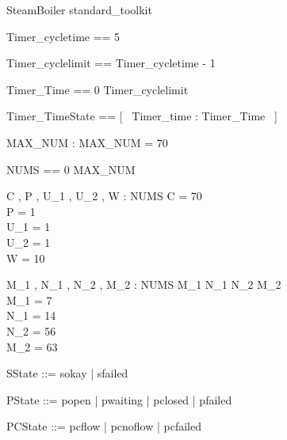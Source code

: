 \documentclass{article}
\begin{document}
\begin{zsection}
    \SECTION SteamBoiler \parents standard\_toolkit
\end{zsection}

\begin{zed}
	Timer\_cycletime == 5
\end{zed}

\begin{zed}
	Timer\_cyclelimit == Timer\_cycletime - 1
\end{zed}

\begin{zed}
	Timer\_Time == 0 \upto Timer\_cyclelimit
\end{zed}

\begin{zed}
	Timer\_TimeState == [~  Timer\_time : Timer\_Time  ~]
\end{zed}

\begin{axdef}
	MAX\_NUM : \nat 
\where
 MAX\_NUM = 70
\end{axdef}

\begin{zed}
	NUMS == 0 \upto MAX\_NUM
\end{zed}

\begin{axdef}
	C , P , U\_1 , U\_2 , W : NUMS 
\where
 C = 70 \\
 P = 1 \\
 U\_1 = 1 \\
 U\_2 = 1 \\
 W = 10
\end{axdef}

\begin{axdef}
	M\_1 , N\_1 , N\_2 , M\_2 : NUMS 
\where
 M\_1 \leq N\_1 \leq N\_2 \leq M\_2 \\
 M\_1 = 7 \\
 N\_1 = 14 \\
 N\_2 = 56 \\
 M\_2 = 63
\end{axdef}

\begin{zed}
	SState ::= sokay | sfailed
\end{zed}

\begin{zed}
	PState ::= popen | pwaiting | pclosed | pfailed
\end{zed}

\begin{zed}
	PCState ::= pcflow | pcnoflow | pcfailed
\end{zed}
\end{document}
